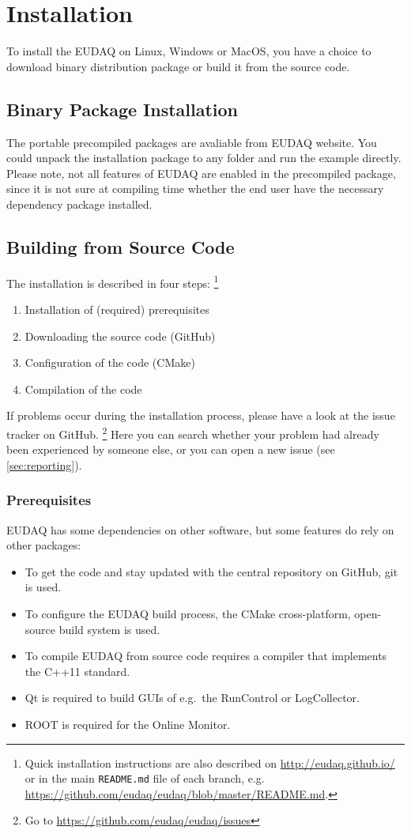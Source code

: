 \section{Installation}
To install the EUDAQ on Linux, Windows or MacOS, you have a choice to download binary distribution package or build it from the source code.

\subsection{Binary Package Installation}
The portable precompiled packages are avaliable from EUDAQ website. You could unpack the installation package to any folder and run the example directly. Please note, not all features of EUDAQ are enabled in the precompiled package, since it is not sure at compiling time whether the end user have the necessary dependency package installed.

\subsection{Building from Source Code}

The installation is described in four steps:%
\footnote{Quick installation instructions are also described on \url{http://eudaq.github.io/} or in the main \texttt{README.md} file of each branch, e.g. \url{https://github.com/eudaq/eudaq/blob/master/README.md}.}
\begin{enumerate}
\item Installation of (required) prerequisites
\item Downloading the source code (GitHub)
\item Configuration of the code (CMake)
\item Compilation of the code
\end{enumerate}

If problems occur during the installation process, please have a look at the issue tracker on GitHub.%
\footnote{Go to \url{https://github.com/eudaq/eudaq/issues}} 
Here you can search whether your problem had already been experienced by someone else, or you can open a new issue (see \autoref{sec:reporting}).

\subsubsection{Prerequisites}

EUDAQ has some dependencies on other software, but some features do rely on other packages:
\begin{itemize}
\item To get the code and stay updated with the central repository on GitHub, git is used.
\item To configure the EUDAQ build process, the CMake cross-platform, open-source build system is used.
\item To compile EUDAQ from source code requires a compiler that implements the C++11 standard.
\item Qt is required to build GUIs of e.g.\ the RunControl or LogCollector. 
\item ROOT is required for the Online Monitor.
\end{itemize}

